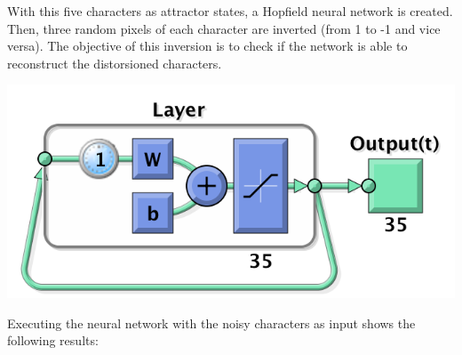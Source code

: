\documentclass[10pt]{article}
\begin{document}
\begin{multicols}{2}
  With this five characters as attractor states, a Hopfield neural
  network is created. Then, three random pixels of each character
  are inverted (from 1 to -1 and vice versa). The objective of this
  inversion is to check if the network is able to reconstruct the
  distorsioned characters.

  \begin{center}
    \includegraphics[width=\linewidth]{img/net}
  \end{center}

  Executing the neural network with the noisy characters as input
  shows the following results:


\end{multicols}
\end{document}
